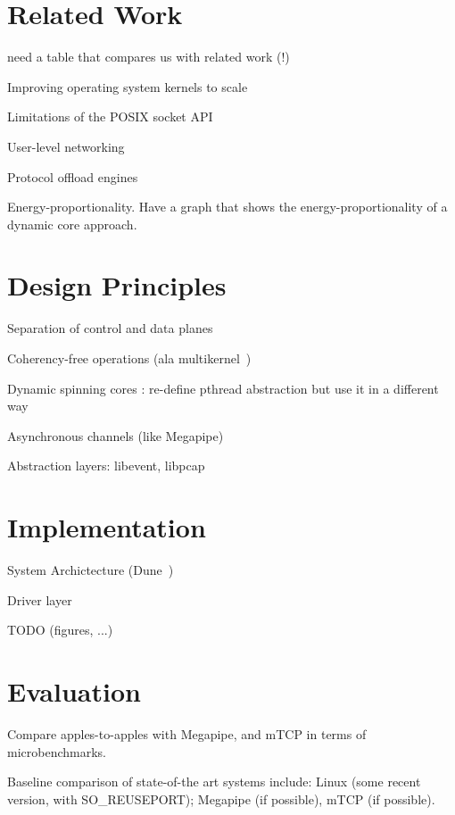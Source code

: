 


\section{Related Work}

\todo need a table that compares us with related work (!)

\todo Improving operating system kernels to scale

\todo Limitations of the POSIX socket API

\todo User-level networking

\todo Protocol offload engines

\todo Energy-proportionality.   Have a graph that shows the energy-proportionality of a dynamic core approach.


\section{Design Principles}



\todo Separation of control and data planes

\todo Coherency-free operations  (ala multikernel~\cite{DBLP:conf/sosp/BaumannBDHIPRSS09})

\todo Dynamic spinning cores : re-define pthread abstraction but use it in a different way

\todo Asynchronous channels (like Megapipe)

\todo Abstraction layers: libevent, libpcap


\section{Implementation}

\todo System Archictecture (Dune~\cite{belay2012dune})

\todo Driver layer

\todo TODO (figures, ...)

\section{Evaluation}


\todo Compare apples-to-apples with Megapipe, and mTCP in terms of microbenchmarks.

\todo Baseline comparison of state-of-the art systems include:  Linux (some recent version, with SO\_REUSEPORT); Megapipe (if possible), mTCP (if possible). 

